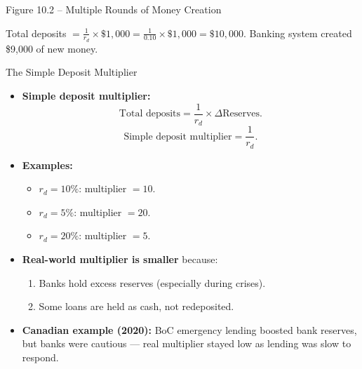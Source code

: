 \documentclass[aspectratio=169]{beamer}
\begin{document}
\begin{frame}{Figure 10.2 -- Multiple Rounds of Money Creation}
\begin{center}
\end{center}
{\tiny Total deposits $= \frac{1}{r_d} \times \$1{,}000 = \frac{1}{0.10} \times \$1{,}000 = \$10{,}000$. Banking system created \$9{,}000 of new money.}
\end{frame}

\begin{frame}{The Simple Deposit Multiplier}
\transfade
\begin{itemize}
  \item \textbf{Simple deposit multiplier:}
  \[
    \text{Total deposits} = \frac{1}{r_d} \times \Delta \text{Reserves}.
  \]
  \[
    \text{Simple deposit multiplier} = \frac{1}{r_d}.
  \]
  \item \textbf{Examples:}
  \begin{itemize}
    \item $r_d = 10\%$: multiplier $= 10$.
    \item $r_d = 5\%$: multiplier $= 20$.
    \item $r_d = 20\%$: multiplier $= 5$.
  \end{itemize}
  \item \textbf{Real-world multiplier is smaller} because:
  \begin{enumerate}
    \item Banks hold excess reserves (especially during crises).
    \item Some loans are held as cash, not redeposited.
  \end{enumerate}
  \item \textbf{Canadian example (2020):} BoC emergency lending boosted bank reserves, but banks were cautious --- real multiplier stayed low as lending was slow to respond.
\end{itemize}
\end{frame}
\end{document}
